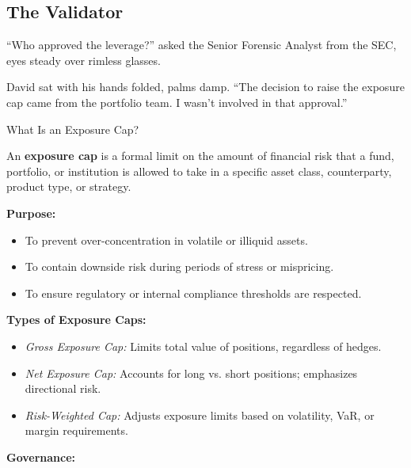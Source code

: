 \medskip

\subsection{The Validator}

``Who approved the leverage?'' asked the Senior Forensic Analyst from the SEC, eyes steady over rimless glasses.

David sat with his hands folded, palms damp. ``The decision to raise the exposure cap came from the portfolio team. 
I wasn’t involved in that approval.''

\medskip

\begin{TechnicalSidebar}{What Is an Exposure Cap?}

  An \textbf{exposure cap} is a formal limit on the amount of financial risk that a fund, portfolio, or 
  institution is allowed to take in a specific asset class, counterparty, product type, or strategy.

  \medskip
  
  \textbf{Purpose:}

  \medskip

  \begin{itemize}
    \item To prevent over-concentration in volatile or illiquid assets.
    \item To contain downside risk during periods of stress or mispricing.
    \item To ensure regulatory or internal compliance thresholds are respected.
  \end{itemize}
  
  \medskip

  \textbf{Types of Exposure Caps:}

  \medskip

  \begin{itemize}
    \item \textit{Gross Exposure Cap:} Limits total value of positions, regardless of hedges.
    \item \textit{Net Exposure Cap:} Accounts for long vs. short positions; emphasizes directional risk.
    \item \textit{Risk-Weighted Cap:} Adjusts exposure limits based on volatility, VaR, or margin 
    requirements.
  \end{itemize}
  
  \medskip

  \textbf{Governance:}


\end{TechnicalSidebar}
